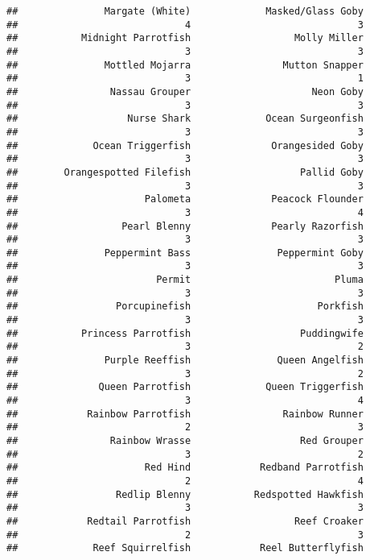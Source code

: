 \documentclass[
]{article}
\begin{document}
\begin{verbatim}
##               Margate (White)             Masked/Glass Goby 
##                             4                             3 
##           Midnight Parrotfish                  Molly Miller 
##                             3                             3 
##               Mottled Mojarra                Mutton Snapper 
##                             3                             1 
##                Nassau Grouper                     Neon Goby 
##                             3                             3 
##                   Nurse Shark             Ocean Surgeonfish 
##                             3                             3 
##             Ocean Triggerfish              Orangesided Goby 
##                             3                             3 
##        Orangespotted Filefish                   Pallid Goby 
##                             3                             3 
##                      Palometa              Peacock Flounder 
##                             3                             4 
##                  Pearl Blenny              Pearly Razorfish 
##                             3                             3 
##               Peppermint Bass               Peppermint Goby 
##                             3                             3 
##                        Permit                         Pluma 
##                             3                             3 
##                 Porcupinefish                      Porkfish 
##                             3                             3 
##           Princess Parrotfish                   Puddingwife 
##                             3                             2 
##               Purple Reeffish               Queen Angelfish 
##                             3                             2 
##              Queen Parrotfish             Queen Triggerfish 
##                             3                             4 
##            Rainbow Parrotfish                Rainbow Runner 
##                             2                             3 
##                Rainbow Wrasse                   Red Grouper 
##                             3                             2 
##                      Red Hind            Redband Parrotfish 
##                             2                             4 
##                 Redlip Blenny           Redspotted Hawkfish 
##                             3                             3 
##            Redtail Parrotfish                  Reef Croaker 
##                             2                             3 
##             Reef Squirrelfish            Reel Butterflyfish 

\end{verbatim}
\end{document}

